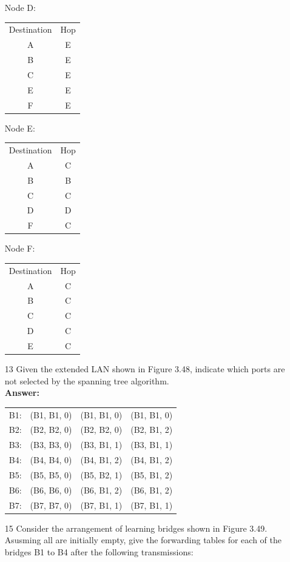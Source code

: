 \documentclass[a4paper]{article}
\begin{document}
\begin{itemize}
	Node D: \begin{tabular}{c|c}
	Destination & Hop \\
	A & E \\
	B & E \\
	C & E \\
	E & E \\
	F & E \\
	\end{tabular}
	Node E: \begin{tabular}{c|c}
	Destination & Hop \\
	A & C \\
	B & B \\
	C & C \\
	D & D \\
	F & C \\
	\end{tabular}
	Node F: \begin{tabular}{c|c}
	Destination & Hop \\
	A & C \\
	B & C \\
	C & C \\
	D & C \\
	E & C \\
	\end{tabular}
	\item[13] Given the extended LAN shown in Figure 3.48, indicate which ports are not selected by the spanning tree algorithm. \\
	      \textbf{Answer:} \\
	      \begin{tabular}{c c c c}
	      	B1: & (B1, B1, 0) & (B1, B1, 0) & (B1, B1, 0) \\
	      	B2: & (B2, B2, 0) & (B2, B2, 0) & (B2, B1, 2) \\
	      	B3: & (B3, B3, 0) & (B3, B1, 1) & (B3, B1, 1) \\
	      	B4: & (B4, B4, 0) & (B4, B1, 2) & (B4, B1, 2) \\
	      	B5: & (B5, B5, 0) & (B5, B2, 1) & (B5, B1, 2) \\
	      	B6: & (B6, B6, 0) & (B6, B1, 2) & (B6, B1, 2) \\
	      	B7: & (B7, B7, 0) & (B7, B1, 1) & (B7, B1, 1) \\
	      \end{tabular}
	\item[15] Consider the arrangement of learning bridges shown in Figure 3.49. Asusming all are initially empty, give the forwarding tables for each of the bridges B1 to B4 after the following transmissions: \\

\end{itemize}
\end{document}
